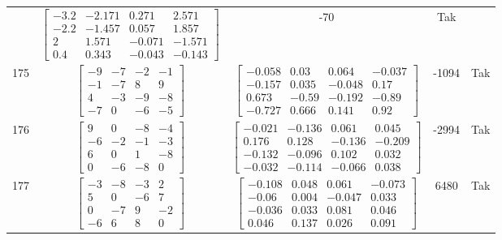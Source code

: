 \documentclass[a4paper,12pt]{article}
\begin{document}
\begin{tabular}{c c c c c}
&
$\begin{bmatrix} -3.2 & -2.171 & 0.271 & 2.571 \\ -2.2 & -1.457 & 0.057 & 1.857 \\ 2 & 1.571 & -0.071 & -1.571 \\ 0.4 & 0.343 & -0.043 & -0.143 \end{bmatrix}$
&
-70
&
Tak
\\
175
&
$\begin{bmatrix} -9 & -7 & -2 & -1 \\ -1 & -7 & 8 & 9 \\ 4 & -3 & -9 & -8 \\ -7 & 0 & -6 & -5 \end{bmatrix}$
&
$\begin{bmatrix} -0.058 & 0.03 & 0.064 & -0.037 \\ -0.157 & 0.035 & -0.048 & 0.17 \\ 0.673 & -0.59 & -0.192 & -0.89 \\ -0.727 & 0.666 & 0.141 & 0.92 \end{bmatrix}$
&
-1094
&
Tak
\\
176
&
$\begin{bmatrix} 9 & 0 & -8 & -4 \\ -6 & -2 & -1 & -3 \\ 6 & 0 & 1 & -8 \\ 0 & -6 & -8 & 0 \end{bmatrix}$
&
$\begin{bmatrix} -0.021 & -0.136 & 0.061 & 0.045 \\ 0.176 & 0.128 & -0.136 & -0.209 \\ -0.132 & -0.096 & 0.102 & 0.032 \\ -0.032 & -0.114 & -0.066 & 0.038 \end{bmatrix}$
&
-2994
&
Tak
\\
177
&
$\begin{bmatrix} -3 & -8 & -3 & 2 \\ 5 & 0 & -6 & 7 \\ 0 & -7 & 9 & -2 \\ -6 & 6 & 8 & 0 \end{bmatrix}$
&
$\begin{bmatrix} -0.108 & 0.048 & 0.061 & -0.073 \\ -0.06 & 0.004 & -0.047 & 0.033 \\ -0.036 & 0.033 & 0.081 & 0.046 \\ 0.046 & 0.137 & 0.026 & 0.091 \end{bmatrix}$
&
6480
&
Tak
\\

\end{tabular}
\end{document}
